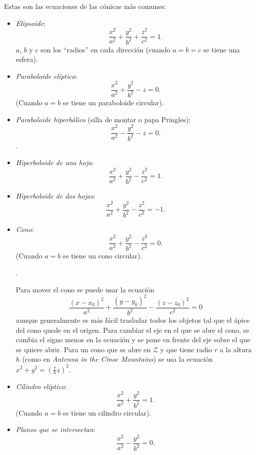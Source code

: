 \documentclass[10pt,letterpaper,twocolumn]{article}
\begin{document}
Estas son las ecuaciones de las cónicas más comunes:


\begin{itemize}
    \item \emph{Elipsoide}: $$ \frac{x^2}{a^2} + \frac{y^2}{b^2} + \frac{z^2}{c^2} = 1.$$
    $a$, $b$ y $c$ son los  ``radios'' en cada dirección (cuando $a = b = c$ se tiene una esfera).
    \item \emph{Paraboloide elíptico}: $$ \frac{x^2}{a^2} + \frac{y^2}{b^2} - z = 0.$$ (Cuando $a = b$ se tiene un paraboloide circular).
    \item \emph{Paraboloide hiperbólico} (\small{silla de montar o papa Pringles}): $$ \frac{x^2}{a^2} - \frac{y^2}{b^2} - z = 0.$$.
    \item \emph{Hiperboloide de una hoja}: $$ \frac{x^2}{a^2} + \frac{y^2}{b^2} - \frac{z^2}{c^2} = 1.$$
    \item \emph{Hiperboloide de dos hojas}: $$ \frac{x^2}{a^2} + \frac{y^2}{b^2} - \frac{z^2}{c^2} = -1.$$
    \item \emph{Cono}: $$ \frac{x^2}{a^2} + \frac{y^2}{b^2} - \frac{z^2}{c^2} = 0.$$ (Cuando $a = b$ se tiene un cono circular).
    
    .
    
    Para mover el cono se puede usar la ecuación $$ \frac{(x - x_0)^2}{a^2} + \frac{(y - y_0)^2}{b^2} - \frac{(z - z_0)^2}{c^2} = 0$$ aunque generalmente es más fácil trasladar todos los objetos tal que el ápice del cono quede en el origen. Para cambiar el eje en el que se abre el cono, se cambia el signo menos en la ecuación y se pone en frente del eje sobre el que se quiere abrir. Para un cono que se abre en $\mathcal{Z}$ y que tiene radio $r$ a la altura $h$ (como en \emph{Antenna in the Cinoc Mountains}) se usa la ecuación $ \displaystyle x^2 + y^2 = (\frac{r}{h}z)^2.$
    
    \item \emph{Cilindro elíptico}: $$ \frac{x^2}{a^2} + \frac{y^2}{b^2} = 1.$$ (Cuando $a = b$ se tiene un cilindro circular).
    \item \emph{Planos que se intersectan}: $$ \frac{x^2}{a^2} - \frac{y^2}{b^2} = 0. $$
    
\end{itemize}
\end{document}
